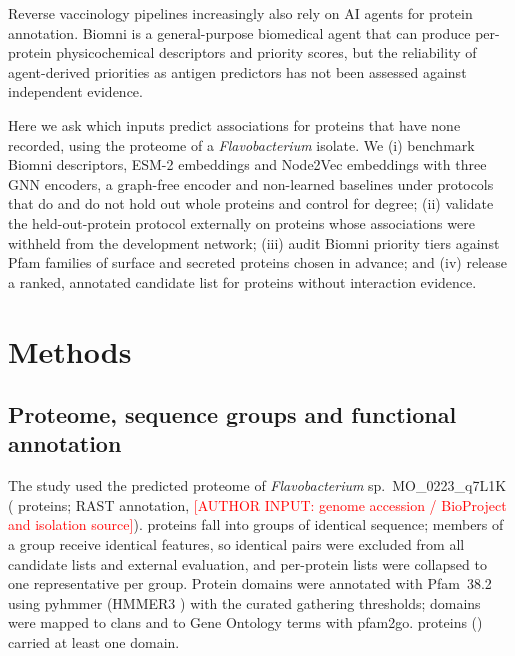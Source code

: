 \documentclass[pdflatex,sn-mathphys-num]{sn-jnl}
\newcommand{\authorinput}[1]{\textcolor{red}{[AUTHOR INPUT: #1]}}
\begin{document}
Reverse vaccinology pipelines increasingly also rely on AI agents for protein annotation. Biomni is a general-purpose biomedical agent \cite{huang2025biomni} that can produce per-protein physicochemical descriptors and priority scores, but the reliability of agent-derived priorities as antigen predictors has not been assessed against independent evidence.

Here we ask which inputs predict associations for proteins that have none recorded, using the proteome of a \textit{Flavobacterium} isolate. We (i) benchmark Biomni descriptors, ESM-2 embeddings \cite{lin2023esm2} and Node2Vec embeddings \cite{grover2016node2vec} with three GNN encoders, a graph-free encoder and non-learned baselines under protocols that do and do not hold out whole proteins and control for degree; (ii) validate the held-out-protein protocol externally on proteins whose associations were withheld from the development network; (iii) audit Biomni priority tiers against Pfam families of surface and secreted proteins chosen in advance; and (iv) release a ranked, annotated candidate list for proteins without interaction evidence.

\section{Methods}\label{sec:methods}

\subsection{Proteome, sequence groups and functional annotation}
The study used the predicted proteome of \textit{Flavobacterium} sp.\ MO\_0223\_q7L1K (\nProteins{} proteins; RAST annotation, \authorinput{genome accession / BioProject and isolation source}). \nIdentProteins{} proteins fall into \nIdentGroups{} groups of identical sequence; members of a group receive identical features, so identical pairs were excluded from all candidate lists and external evaluation, and per-protein lists were collapsed to one representative per group. Protein domains were annotated with Pfam~38.2 \cite{paysanlafosse2025pfam} using pyhmmer \cite{larralde2023pyhmmer} (HMMER3 \cite{eddy2011hmmer}) with the curated gathering thresholds; domains were mapped to clans and to Gene Ontology terms with pfam2go. \nPfamAnnotated{} proteins (\pctPfamAnnotated) carried at least one domain.
\end{document}
